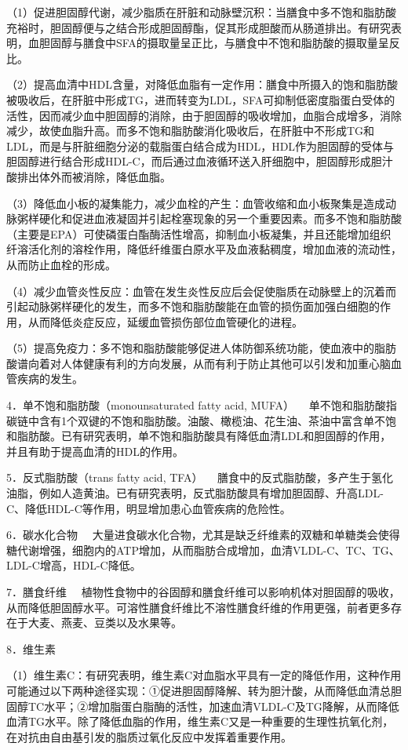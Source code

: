 （1）促进胆固醇代谢，减少脂质在肝脏和动脉壁沉积：当膳食中多不饱和脂肪酸充裕时，胆固醇便与之结合形成胆固醇酯，促其形成胆酸而从肠道排出。有研究表明，血胆固醇与膳食中SFA的摄取量呈正比，与膳食中不饱和脂肪酸的摄取量呈反比。

（2）提高血清中HDL含量，对降低血脂有一定作用：膳食中所摄入的饱和脂肪酸被吸收后，在肝脏中形成TG，进而转变为LDL，SFA可抑制低密度脂蛋白受体的活性，因而减少血中胆固醇的消除，由于胆固醇的吸收增加，血脂合成增多，消除减少，故使血脂升高。而多不饱和脂肪酸消化吸收后，在肝脏中不形成TG和LDL，而是与肝脏细胞分泌的载脂蛋白结合成为HDL，HDL作为胆固醇的受体与胆固醇进行结合形成HDL-C，而后通过血液循环送入肝细胞中，胆固醇形成胆汁酸排出体外而被消除，降低血脂。

（3）降低血小板的凝集能力，减少血栓的产生：血管收缩和血小板聚集是造成动脉粥样硬化和促进血液凝固并引起栓塞现象的另一个重要因素。而多不饱和脂肪酸（主要是EPA）可使磷蛋白酯酶活性增高，抑制血小板凝集，并且还能增加组织纤溶活化剂的溶栓作用，降低纤维蛋白原水平及血液黏稠度，增加血液的流动性，从而防止血栓的形成。

（4）减少血管炎性反应：血管在发生炎性反应后会促使脂质在动脉壁上的沉着而引起动脉粥样硬化的发生，而多不饱和脂肪酸能在血管的损伤面加强白细胞的作用，从而降低炎症反应，延缓血管损伤部位血管硬化的进程。

（5）提高免疫力：多不饱和脂肪酸能够促进人体防御系统功能，使血液中的脂肪酸谱向着对人体健康有利的方向发展，从而有利于防止其他可以引发和加重心脑血管疾病的发生。

{4．单不饱和脂肪酸（monounsaturated fatty acid, MUFA）}
　单不饱和脂肪酸指碳链中含有1个双键的不饱和脂肪酸。油酸、橄榄油、花生油、茶油中富含单不饱和脂肪酸。已有研究表明，单不饱和脂肪酸具有降低血清LDL和胆固醇的作用，并且有助于提高血清的HDL的作用。

{5．反式脂肪酸（trans fatty acid, TFA）}
　膳食中的反式脂肪酸，多产生于氢化油脂，例如人造黄油。已有研究表明，反式脂肪酸具有增加胆固醇、升高LDL-C、降低HDL-C等作用，明显增加患心血管疾病的危险性。

{6．碳水化合物}
　大量进食碳水化合物，尤其是缺乏纤维素的双糖和单糖类会使得糖代谢增强，细胞内的ATP增加，从而脂肪合成增加，血清VLDL-C、TC、TG、LDL-C增高，HDL-C降低。

{7．膳食纤维}
　植物性食物中的谷固醇和膳食纤维可以影响机体对胆固醇的吸收，从而降低胆固醇水平。可溶性膳食纤维比不溶性膳食纤维的作用更强，前者更多存在于大麦、燕麦、豆类以及水果等。

{8．维生素}

（1）维生素C：有研究表明，维生素C对血脂水平具有一定的降低作用，这种作用可能通过以下两种途径实现：①促进胆固醇降解、转为胆汁酸，从而降低血清总胆固醇TC水平；②增加脂蛋白脂酶的活性，加速血清VLDL-C及TG降解，从而降低血清TG水平。除了降低血脂的作用，维生素C又是一种重要的生理性抗氧化剂，在对抗由自由基引发的脂质过氧化反应中发挥着重要作用。

